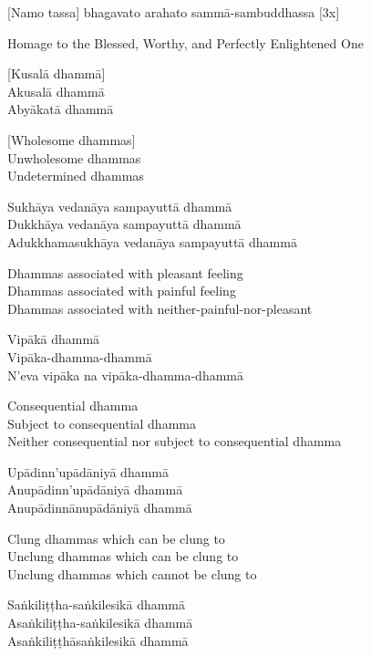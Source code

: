 [Namo tassa] bhagavato arahato sammā-sambuddhassa [3x]

\begin{english}
  Homage to the Blessed, Worthy, and Perfectly Enlightened One
\end{english}

[Kusalā dhammā]\\
Akusalā dhammā\\
Abyākatā dhammā

\begin{english}
  [Wholesome dhammas]\\
  Unwholesome dhammas\\
  Undetermined dhammas
\end{english}

Sukhāya vedanāya sampayuttā dhammā\\
Dukkhāya vedanāya sampayuttā dhammā\\
Adukkhamasukhāya vedanāya sampayuttā dhammā

\begin{english}
  Dhammas associated with pleasant feeling\\
  Dhammas associated with painful feeling\\
  Dhammas associated with neither-painful-nor-pleasant
\end{english}

Vipākā dhammā\\
Vipāka-dhamma-dhammā\\
N’eva vipāka na vipāka-dhamma-dhammā

\begin{english}
  Consequential dhamma\\
  Subject to consequential dhamma\\
  Neither consequential nor subject to consequential dhamma
\end{english}

Upādinn’upādāniyā dhammā\\
Anupādinn’upādāniyā dhammā\\
Anupādinnānupādāniyā dhammā

\begin{english}
  Clung dhammas which can be clung to\\
  Unclung dhammas which can be clung to\\
  Unclung dhammas which cannot be clung to
\end{english}

Saṅkiliṭṭha-saṅkilesikā dhammā\\
Asaṅkiliṭṭha-saṅkilesikā dhammā\\
Asaṅkiliṭṭhāsaṅkilesikā dhammā

